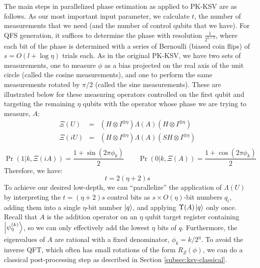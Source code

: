 The main steps in parallelized phase estimation as applied to PK-KSV
are as follows. As our most important input parameter, we calculate $t$, the number
of measurements that we need (and the number of control qubits that we have).
For QFS generation, it suffices to determine the phase with resolution $\frac{1}{2^{{\eta}+2}}$,
where each bit of the phase is determined with a series of Bernoulli (biased coin flips)
of $s=O(l + \log \eta)$ trials each. As in the original PK-KSV, we have two sets of measurements,
one to measure $\phi$ as a bias projected on the real axis of the unit circle (called
the cosine measurements), and one to perform the same measurements rotated by $\pi/2$
(called the sine measurements). These are illustrated below for these
measuring operators controlled on the first qubit and targeting the remaining
$\eta$ qubits with the operator whose phase we are trying to measure, $A$:
%
\begin{eqnarray}
\Xi(U) & = & (H\otimes I^{\otimes \eta})\Lambda(A)(H \otimes I^{\otimes \eta})\\
\Xi(iU) & = & (H\otimes I^{\otimes \eta})\Lambda(A)(SH \otimes I^{\otimes \eta})\\
\end{eqnarray}
%
\begin{equation}
\Pr(1|k,\Xi(iA)) = \frac{1 + \sin(2\pi\phi_k)}{2} \qquad \Pr(0|k,\Xi(A)) = \frac{1 + \cos(2\pi\phi_k)}{2}
\end{equation}
%
Therefore, we have:
%
\begin{equation}
t = 2({\eta}+2)s
\end{equation}
%
To achieve our desired low-depth, we can ``parallelize'' the application of
$\Lambda(U)$ by interpreting the
$t = ({\eta}+2)s$ control bits as $s\times O({\eta})$-bit numbers $q_i$,
adding them into a single $\eta$-bit number $\left\vert{q}\right\rangle$, and
applying $\Upsilon(A)\left\vert{q}\right\rangle$ only once.
Recall that $A$ is the addition operator on an ${\eta}$ qubit
target register containing $\left\vert{\psi_{\eta}^{(k)}}\right\rangle$, so we can
only effectively add the lowest ${\eta}$ bits of $q$.
Furthermore, the eigenvalues of $A$ are rational with a fixed
denominator, $\phi_k = k / 2^{\eta}$.
To avoid the inverse QFT, which often has small rotations of the form 
$R_Z(\phi)$, 
we can do a classical post-processing step as described in Section \ref{subsec:ksv-classical}.


